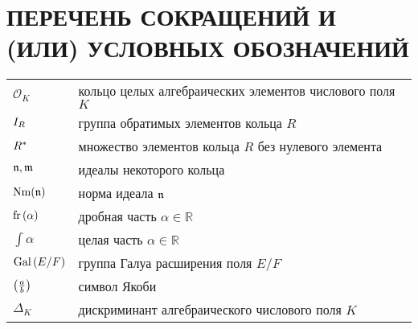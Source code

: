 \documentclass[_00_dissertation.tex]{subfiles}
\begin{document}
\onlyinsubfile{
    \renewcommand{\contentsname}{ОГЛАВЛЕНИЕ}
    \setcounter{tocdepth}{3}
    \tableofcontents
}

\chapter*{ПЕРЕЧЕНЬ СОКРАЩЕНИЙ И (ИЛИ) УСЛОВНЫХ ОБОЗНАЧЕНИЙ}

\begin{longtable}{p{}p{}}
    $\mathcal{O}_{K}$ & кольцо целых алгебраических элементов числового поля $K$\\

    $I_{R}$ & группа обратимых элементов кольца $R$\\

    $R^{*}$ & множество элементов кольца $R$ без нулевого элемента\\

    $\mathfrak{n}, \mathfrak{m}$ & идеалы некоторого кольца\\

    $\textrm{Nm}(\mathfrak{n})$ & норма идеала $\mathfrak{n}$\\

    $\textrm{fr}\left(\alpha\right)$ & дробная часть $\alpha \in \mathbb{R}$\\

    $\int{\alpha}$ & целая часть $\alpha \in \mathbb{R}$\\

    $\textrm{Gal}\left(E/F\right)$ & группа Галуа расширения поля $E/F$\\

    $\left(\frac{a}{b}\right)$ & символ Якоби\\

    $\Delta_{K}$ & дискриминант алгебраического числового поля $K$\\

\end{longtable}
\end{document}
